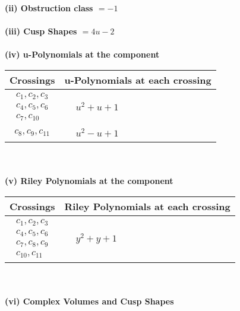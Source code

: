 \documentclass[1p]{elsarticle_modified}
\theoremstyle{definition}
\begin{document}
\flushleft \textbf{(ii) Obstruction class $= -1$}\\~\\
\flushleft \textbf{(iii) Cusp Shapes $= 4 u-2$}\\~\\
\newpage\renewcommand{\arraystretch}{1}
\flushleft \textbf{(iv) u-Polynomials at the component}\newline \\
\begin{tabular}{m{50pt}|m{274pt}}
Crossings & \hspace{64pt}u-Polynomials at each crossing \\
\hline $$\begin{aligned}c_{1},c_{2},c_{3}\\c_{4},c_{5},c_{6}\\c_{7},c_{10}\end{aligned}$$&$\begin{aligned}
&u^2+u+1
\end{aligned}$\\
\hline $$\begin{aligned}c_{8},c_{9},c_{11}\end{aligned}$$&$\begin{aligned}
&u^2- u+1
\end{aligned}$\\
\hline
\end{tabular}\\~\\
\newpage\renewcommand{\arraystretch}{1}
\flushleft \textbf{(v) Riley Polynomials at the component}\newline \\
\begin{tabular}{m{50pt}|m{274pt}}
Crossings & \hspace{64pt}Riley Polynomials at each crossing \\
\hline $$\begin{aligned}c_{1},c_{2},c_{3}\\c_{4},c_{5},c_{6}\\c_{7},c_{8},c_{9}\\c_{10},c_{11}\end{aligned}$$&$\begin{aligned}
&y^2+y+1
\end{aligned}$\\
\hline
\end{tabular}\\~\\
\newpage\flushleft \textbf{(vi) Complex Volumes and Cusp Shapes}
\end{document}
